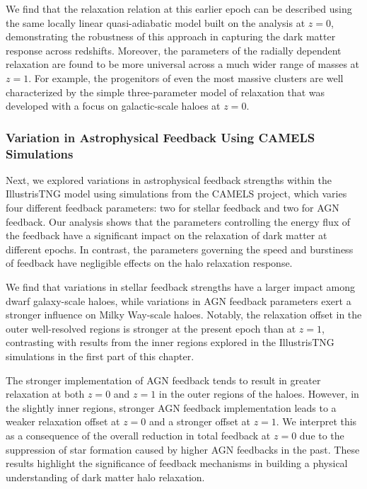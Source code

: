 We find that the relaxation relation at this earlier epoch can be described using the same locally linear quasi-adiabatic model built on the analysis at \( z=0 \), demonstrating the robustness of this approach in capturing the dark matter response across redshifts. Moreover, the parameters of the radially dependent relaxation are found to be more universal across a much wider range of masses at \( z=1 \). For example, the progenitors of even the most massive clusters are well characterized by the simple three-parameter model of relaxation that was developed with a focus on galactic-scale haloes at \( z=0 \).

\subsubsection*{Variation in Astrophysical Feedback Using CAMELS Simulations}
Next, we explored variations in astrophysical feedback strengths within the IllustrisTNG model using simulations from the CAMELS project, which varies four different feedback parameters: two for stellar feedback and two for AGN feedback. Our analysis shows that the parameters controlling the energy flux of the feedback have a significant impact on the relaxation of dark matter at different epochs. In contrast, the parameters governing the speed and burstiness of feedback have negligible effects on the halo relaxation response.

We find that variations in stellar feedback strengths have a larger impact among dwarf galaxy-scale haloes, while variations in AGN feedback parameters exert a stronger influence on Milky Way-scale haloes. Notably, the relaxation offset in the outer well-resolved regions is stronger at the present epoch than at \( z=1 \), contrasting with results from the inner regions explored in the IllustrisTNG simulations in the first part of this chapter.

The stronger implementation of AGN feedback tends to result in greater relaxation at both \( z=0 \) and \( z=1 \) in the outer regions of the haloes. However, in the slightly inner regions, stronger AGN feedback implementation leads to a weaker relaxation offset at \( z=0 \) and a stronger offset at \( z=1 \). We interpret this as a consequence of the overall reduction in total feedback at \( z=0 \) due to the suppression of star formation caused by higher AGN feedbacks in the past. These results highlight the significance of feedback mechanisms in building a physical understanding of dark matter halo relaxation.

